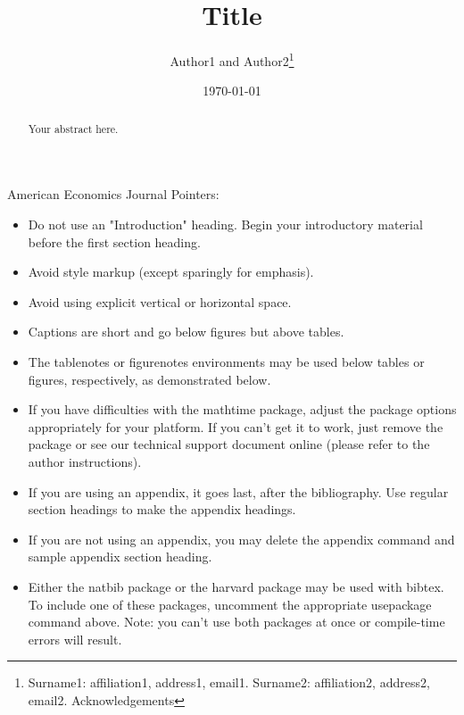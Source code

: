 \documentclass[AEJ]{Formatting/AEA}
\begin{document}
\title{Title}
\author{Author1 and Author2\thanks{%
Surname1: affiliation1, address1, email1. Surname2: affiliation2, address2,
email2. Acknowledgements}}
\date{\today}
\JEL{}
\Keywords{}

\begin{abstract}
Your abstract here.
\end{abstract}

\maketitle

American Economics Journal Pointers:

\begin{itemize}
\item Do not use an "Introduction" heading. Begin your introductory material
before the first section heading.

\item Avoid style markup (except sparingly for emphasis).

\item Avoid using explicit vertical or horizontal space.

\item Captions are short and go below figures but above tables.

\item The tablenotes or figurenotes environments may be used below tables
or figures, respectively, as demonstrated below.

\item If you have difficulties with the mathtime package, adjust the package
options appropriately for your platform. If you can't get it to work, just
remove the package or see our technical support document online (please
refer to the author instructions).

\item If you are using an appendix, it goes last, after the bibliography.
Use regular section headings to make the appendix headings.

\item If you are not using an appendix, you may delete the appendix command
and sample appendix section heading.

\item Either the natbib package or the harvard package may be used with bibtex.
To include one of these packages, uncomment the appropriate usepackage command
above. Note: you can't use both packages at once or compile-time errors will result.

\end{itemize}
\end{document}
